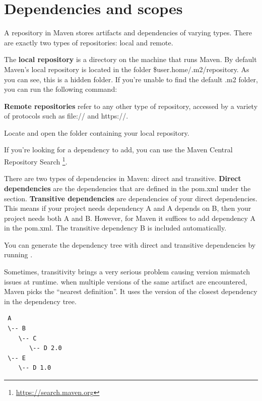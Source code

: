 \section{Dependencies and scopes}

A repository in Maven stores artifacts and dependencies of varying types. There are exactly two types of repositories: local and remote.

The \textbf{local repository} is a directory on the machine that runs Maven.  By default  Maven's local repository is located in the folder \${user.home}/.m2/repository. As you can see, this is a hidden folder.  If you're unable to find the default .m2 folder, you can run the following command:

\textbf{Remote repositories} refer to any other type of repository, accessed by a variety of protocols such as file:// and https://. 

\begin{oefening}
Locate and open the folder containing your local repository. 
\end{oefening}

If you're looking for a dependency to add, you can use the Maven Central Repository Search \footnote{\url{https://search.maven.org}}. 

There are two types of dependencies in Maven: direct and transitive. \textbf{Direct dependencies} are the dependencies that are defined in the pom.xml under the  section.  \textbf{Transitive dependencies} are dependencies of your direct dependencies.  This means if your project needs dependency A and A depends on B, then your project needs both A and B. However, for Maven it suffices to add dependency A in the pom.xml. The transitive dependency B is included automatically.

You can generate the dependency tree with direct and transitive dependencies by running
 .

Sometimes, transitivity brings a very serious problem causing version mismatch issues at runtime.
when multiple versions of the same artifact are encountered, Maven picks the ``nearest definition''. It uses the version of the closest dependency in the dependency tree.

\begin{verbatim}
 A
 \-- B
    \-- C
       \-- D 2.0
 \-- E
    \-- D 1.0
\end{verbatim}

